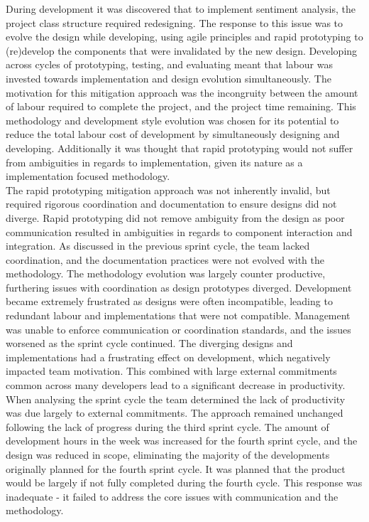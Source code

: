 \documentclass[9pt, titlepage]{extarticle}
\begin{document}
During development it was discovered that to implement sentiment analysis, the project class structure required redesigning. The response to this issue was to evolve the design while developing, using agile principles \cite{web:agile} and rapid prototyping \cite{rapid} to (re)develop the components that were invalidated by the new design. Developing across cycles of prototyping, testing, and evaluating meant that labour was invested towards implementation and design evolution simultaneously. The motivation for this mitigation approach was the incongruity between the amount of labour required to complete the project, and the project time remaining. This methodology and development style evolution was chosen for its potential to reduce the total labour cost of development by simultaneously designing and developing. Additionally it was thought that rapid prototyping would not suffer from ambiguities in regards to implementation, given its nature as a implementation focused methodology.\\

The rapid prototyping mitigation approach was not inherently invalid, but required rigorous coordination and documentation to ensure designs did not diverge. Rapid prototyping did not remove ambiguity from the design as poor communication resulted in ambiguities in regards to component interaction and integration. As discussed in the previous sprint cycle, the team lacked coordination, and the documentation practices were not evolved with the methodology. The methodology evolution was largely counter productive, furthering issues with coordination as design prototypes diverged. Development became extremely frustrated as designs were often incompatible, leading to redundant labour and implementations that were not compatible. Management was unable to enforce communication or coordination standards, and the issues worsened as the sprint cycle continued. The diverging designs and implementations had a frustrating effect on development, which negatively impacted team motivation. This combined with large external commitments common across many developers lead to a significant decrease in productivity.\\

When analysing the sprint cycle the team determined the lack of productivity was due largely to external commitments. The approach remained unchanged following the lack of progress during the third sprint cycle. The amount of development hours in the week was increased for the fourth sprint cycle, and the design was reduced in scope, eliminating the majority of the developments originally planned for the fourth sprint cycle. It was planned that the product would be largely if not fully completed during the fourth cycle. This response was inadequate - it failed to address the core issues with communication and the methodology.
\end{document}
